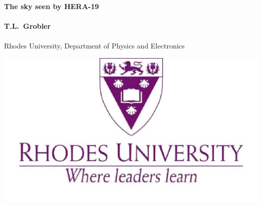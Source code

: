 \documentclass[a0,portrait]{a0poster}
\begin{document}


\begin{minipage}[b]{0.75\linewidth}
\veryHuge \color{NavyBlue} \textbf{The sky seen by HERA-19} \color{Black}\\ %
\\
\huge \textbf{T.L.~Grobler}\\[0.5cm] %
\\
\huge Rhodes University, Department of Physics and Electronics\\[0.4cm] %
\end{minipage}
%
\begin{minipage}[b]{0.25\linewidth}
\includegraphics[width=20cm]{Rhodes_logo.jpg}\\
\end{minipage}

\vspace{1cm} %
\end{document}
